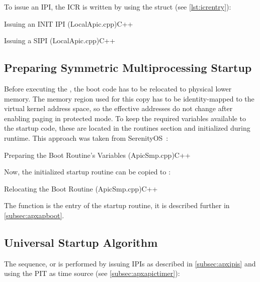To issue an IPI, the ICR is written by using the  struct (see \autoref{lst:icrentry}):

\begin{codeblock}{Issuing an INIT IPI (LocalApic.cpp)}{C++}
\end{codeblock}

\begin{codeblock}{Issuing a SIPI (LocalApic.cpp)}{C++}
\end{codeblock}

\subsection{Preparing Symmetric Multiprocessing Startup}
\label{subsec:apxpreparesmp}

Before executing the , the boot code has to be relocated to physical lower memory.
The memory region used for this copy has to be identity-mapped to the virtual kernel address space, so the effective addresses do not change after enabling paging in protected mode.
To keep the required variables available to the startup code, these are located in the routines  section and initialized during runtime.
This approach was taken from SerenityOS~\autocite[APIC.cpp]{serenity}:

\begin{codeblock}{Preparing the Boot Routine's Variables (ApicSmp.cpp)}{C++}
\end{codeblock}

Now, the initialized startup routine can be copied to :

\begin{codeblock}{Relocating the Boot Routine (ApicSmp.cpp)}{C++}
\end{codeblock}

The  function is the entry of the startup routine, it is described further in \autoref{subsec:apxapboot}.

\subsection{Universal Startup Algorithm}
\label{subsec:apxmpusa}

The  sequence, or  is performed by issuing IPIs as described in \autoref{subsec:apxipis} and using the PIT as time source (see \autoref{subsec:apxapictimer}):

